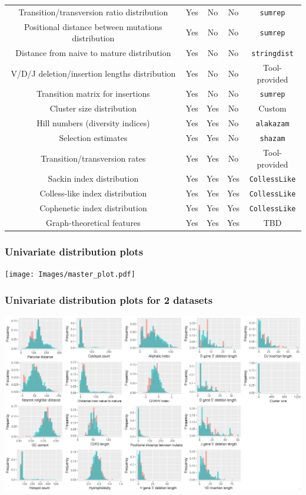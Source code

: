 \documentclass[mathserif,compress]{beamer}
\renewcommand\;{\,}
\begin{document}
\begin{frame}
\begin{tabular}{c|c|c|c|c}
Transition/transversion ratio distribution & Yes & No & No & \texttt{sumrep} \\
Positional distance between mutations distribution & Yes & No & No & \texttt{sumrep}  \\
Distance from naive to mature distribution & Yes & No & No & \texttt{stringdist} \\
V/D/J deletion/insertion lengths distribution & Yes & No & No & Tool-provided \\
Transition matrix for insertions & Yes & No & No & \texttt{sumrep} \\
\hline
Cluster size distribution & Yes & Yes & No & Custom \\
Hill numbers (diversity indices) & Yes & Yes & No & \texttt{alakazam} \\
Selection estimates & Yes & Yes & No & \texttt{shazam} \\
Transition/transversion rates & Yes & Yes & No & Tool-provided \\
\hline
Sackin index distribution & Yes & Yes & Yes & \texttt{CollessLike} \\
Colless-like index distribution & Yes & Yes & Yes & \texttt{CollessLike} \\
Cophenetic index distribution & Yes & Yes & Yes & \texttt{CollessLike} \\
Graph-theoretical features & Yes & Yes & Yes & TBD \\
\end{tabular}
\end{frame}

\begin{frame}\frametitle{Univariate distribution plots}
\begin{center}
\texttt{[image: Images/master\_plot.pdf]}
\end{center}
\end{frame}

\begin{frame}\frametitle{Univariate distribution plots for 2 datasets}
\begin{center}
\includegraphics[width=\linewidth]{Images/Dual_summaries.png}
\end{center}
\end{frame}
\end{document}
